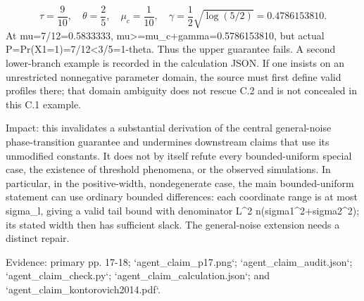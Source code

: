 \documentclass[10pt]{article}
\begin{document}
\[\tau=\frac9{10},\quad\theta=\frac25,\quad\mu_c=\frac1{10},\quad\gamma=\frac12\sqrt{\log(5/2)}=0.4786153810.\] At mu=7/12=0.5833333, mu>=mu\_c+gamma=0.5786153810, but actual P=Pr(X1=1)=7/12<3/5=1-theta. Thus the upper guarantee fails. A second lower-branch example is recorded in the calculation JSON. If one insists on an unrestricted nonnegative parameter domain, the source must first define valid profiles there; that domain ambiguity does not rescue C.2 and is not concealed in this C.1 example.\par
Impact: this invalidates a substantial derivation of the central general-noise phase-transition guarantee and undermines downstream claims that use its unmodified constants. It does not by itself refute every bounded-uniform special case, the existence of threshold phenomena, or the observed simulations. In particular, in the positive-width, nondegenerate case, the main bounded-uniform statement can use ordinary bounded differences: each coordinate range is at most sigma\_l, giving a valid tail bound with denominator L\textasciicircum{}2 n(sigma1\textasciicircum{}2+sigma2\textasciicircum{}2); its stated width then has sufficient slack. The general-noise extension needs a distinct repair.\par
Evidence: primary pp. 17-18; `agent\_claim\_p17.png`; `agent\_claim\_audit.json`; `agent\_claim\_check.py`; `agent\_claim\_calculation.json`; and `agent\_claim\_kontorovich2014.pdf`.\par
\end{document}
